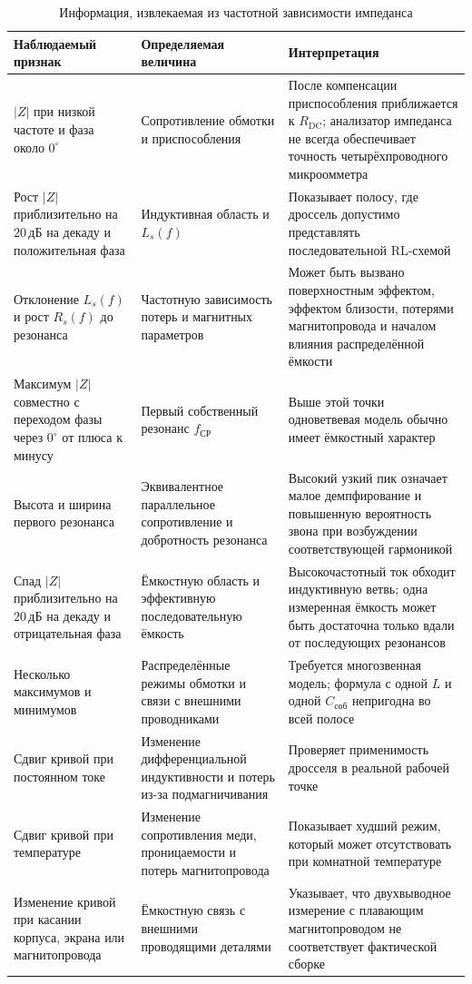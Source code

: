\documentclass[14pt,a4paper]{extarticle}
\begin{document}
\begin{table}[htbp]
\begin{singlespace}
\caption{Информация, извлекаемая из частотной зависимости импеданса}
\label{tab:information-from-impedance}
\centering
\small
\begin{tabularx}{\textwidth}{>{\raggedright\arraybackslash}p{35mm}
>{\raggedright\arraybackslash}p{49mm}
>{\raggedright\arraybackslash}X}
\toprule
Наблюдаемый признак & Определяемая величина & Интерпретация \\
\midrule
$|Z|$ при низкой частоте и фаза около $0^\circ$ &
Сопротивление обмотки и приспособления &
После компенсации приспособления приближается к $R_{\text{DC}}$; анализатор
импеданса не всегда обеспечивает точность четырёхпроводного микроомметра \\
Рост $|Z|$ приблизительно на $20\,\text{дБ}$ на декаду и положительная фаза &
Индуктивная область и $L_s(f)$ &
Показывает полосу, где дроссель допустимо представлять последовательной
RL-схемой \\
Отклонение $L_s(f)$ и рост $R_s(f)$ до резонанса &
Частотную зависимость потерь и магнитных параметров &
Может быть вызвано поверхностным эффектом, эффектом близости, потерями
магнитопровода и началом влияния распределённой ёмкости \\
Максимум $|Z|$ совместно с переходом фазы через $0^\circ$ от плюса к минусу &
Первый собственный резонанс $f_{\text{СР}}$ &
Выше этой точки одноветвевая модель обычно имеет ёмкостный характер \\
Высота и ширина первого резонанса &
Эквивалентное параллельное сопротивление и добротность резонанса &
Высокий узкий пик означает малое демпфирование и повышенную вероятность
звона при возбуждении соответствующей гармоникой \\
Спад $|Z|$ приблизительно на $20\,\text{дБ}$ на декаду и отрицательная фаза &
Ёмкостную область и эффективную последовательную ёмкость &
Высокочастотный ток обходит индуктивную ветвь; одна измеренная ёмкость может
быть достаточна только вдали от последующих резонансов \\
Несколько максимумов и минимумов &
Распределённые режимы обмотки и связи с внешними проводниками &
Требуется многозвенная модель; формула с одной $L$ и одной
$C_{\text{соб}}$ непригодна во всей полосе \\
Сдвиг кривой при постоянном токе &
Изменение дифференциальной индуктивности и потерь из-за подмагничивания &
Проверяет применимость дросселя в реальной рабочей точке \\
Сдвиг кривой при температуре &
Изменение сопротивления меди, проницаемости и потерь магнитопровода &
Показывает худший режим, который может отсутствовать при комнатной
температуре \\
Изменение кривой при касании корпуса, экрана или магнитопровода &
Ёмкостную связь с внешними проводящими деталями &
Указывает, что двухвыводное измерение с плавающим магнитопроводом не
соответствует фактической сборке \\
\bottomrule
\end{tabularx}
\end{singlespace}
\end{table}
\end{document}

